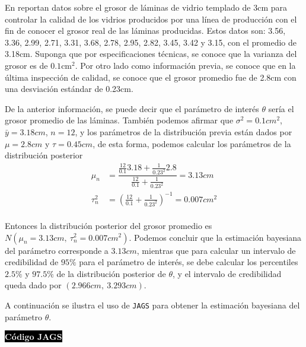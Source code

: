     \begin{Eje}\label{eje_vidrios}
    En  reportan datos sobre el grosor de l\'aminas de vidrio templado de 3cm para controlar la calidad de los vidrios producidos por una l\'inea de producci\'on con el fin de conocer el grosor real de las l\'aminas producidas. Estos datos son: 3.56, 3.36, 2.99, 2.71, 3.31, 3.68, 2.78, 2.95, 2.82, 3.45, 3.42 y 3.15, con el promedio de 3.18cm. Suponga que por especificaciones t\'ecnicas, se conoce que la varianza del grosor es de $0.1\text{cm}^2$. Por otro lado como informaci\'on previa, se conoce que en la \'ultima inspecci\'on de calidad, se conoce que el grosor promedio fue de 2.8cm con una desviaci\'on est\'andar de 0.23cm.
    
    De la anterior informaci\'on, se puede decir que el par\'ametro de inter\'es $\theta$ ser\'ia el grosor promedio de las l\'aminas. Tambi\'en podemos afirmar que $\sigma^2=0.1cm^2$, $\bar{y}=3.18cm$, $n=12$, y los par\'ametros de la distribuci\'on previa est\'an dados por $\mu=2.8cm$ y $\tau=0.45cm$, de esta forma, podemos calcular los par\'ametros de la distribuci\'on posterior
    \begin{align*}
    \mu_n&=\dfrac{\frac{12}{0.1}3.18+\frac{1}{0.23^2}2.8}{\frac{12}{0.1}+\frac{1}{0.23^2}}=3.13cm\\
    \tau^2_n&=\left(\frac{12}{0.1}+\frac{1}{0.23^2}\right)^{-1}=0.007cm^2\\
    \end{align*}
    
    Entonces la distribuci\'on posterior del grosor promedio es $N(\mu_n=3.13cm,\ \tau^2_n=0.007cm^2)$. Podemos concluir que la estimaci\'on bayesiana del par\'ametro corresponde a $3.13cm$, mientras que para calcular un intervalo de credibilidad de $95\%$ para el par\'ametro de inter\'es, se debe calcular los percentiles $2.5\%$ y $97.5\%$ de la distribuci\'on posterior de $\theta$, y el intervalo de credibilidad queda dado por $(2.966cm,\ 3.293cm)$.
    
    A continuaci\'on se ilustra el uso de \verb'JAGS' para obtener la estimaci\'on bayesiana del par\'ametro $\theta$.
    
    \colorbox{black}{\textcolor{white}{\textbf{C\'odigo JAGS}}}
\begin{knitrout}
\color{fgcolor}\begin{kframe}
\begin{alltt}
 \hlkwb{<-} \hlstd{()\{}
   \hlopt{:} 
\hlstd{\{}
 \hlopt{~}  \hlopt{/}\hlstd{)}
\hlstd{\}}
 \hlopt{~} \hlstd{(}\hlstd{,} \hlopt{/}\hlstd{(}\hlopt{^}\hlstd{) )}
\hlstd{\}}


\end{alltt}
\end{kframe}
\end{knitrout}
\end{Eje}
